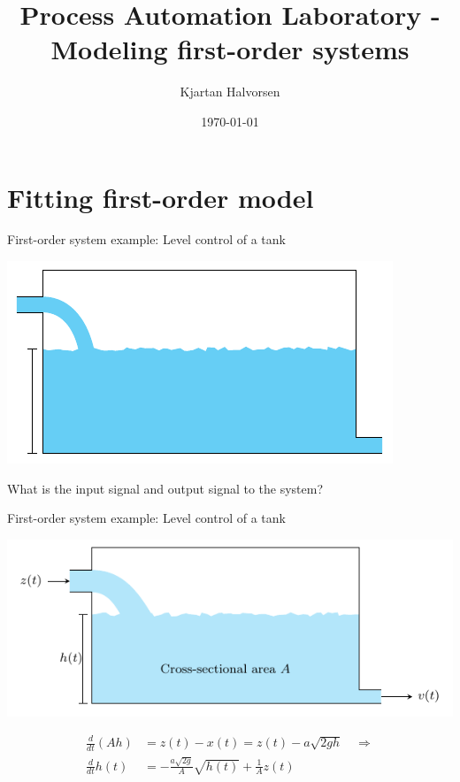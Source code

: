\documentclass[presentation,aspectratio=169]{beamer}
\author{Kjartan Halvorsen}
\date{\today}
\title{Process Automation Laboratory - Modeling first-order systems}
\begin{document}
\maketitle

\section{Fitting first-order model}
\label{sec:org2a0f0ec}
\begin{frame}[label={sec:org01d4e0f}]{First-order system example: Level control of a tank}
\begin{center}
\includegraphics[width=0.7\linewidth]{../../figures/tank-with-hole-no-variables}
\end{center}

What is the \alert{input signal} and \alert{output signal} to the system?
\end{frame}



\begin{frame}[label={sec:orga76c6fa}]{First-order system example: Level control of a tank}
\begin{center}
\includegraphics[width=0.7\linewidth]{../../figures/tank-with-hole-simple}
\end{center}

\begin{align*}
\frac{d}{dt} (Ah) &=  z(t) - x(t) = z(t) - a \sqrt{2gh}\quad \Rightarrow\\
\frac{d}{dt} h(t) &= - \frac{a\sqrt{2g}}{A} \sqrt{h(t)} + \frac{1}{A} z(t)
\end{align*}
\end{frame}
\end{document}

